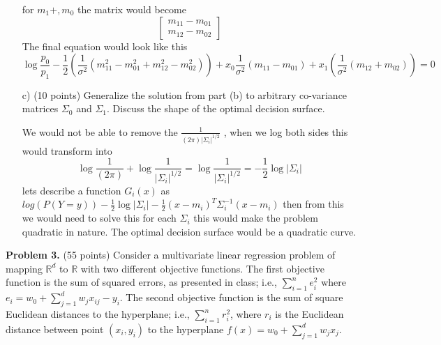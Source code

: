 \documentclass[a4 paper]{article}
\begin{document}
\begin{enumerate}
	for $m_1+,m_0$ the matrix would become
	\begin{equation*}
	\begin{bmatrix}
	m_{11} - m_{01} \\ m_{12} - m_{02}
	\end{bmatrix}
	\end{equation*}
	The final equation would look like this
	\begin{equation*}
	\log{\frac{p_0}{p_1}}-\frac{1}{2}(\frac{1}{\sigma^2}(m_{11}^2-m_{01}^2 + m_{12}^2 - m_{02}^2)) +  x_0\frac{1}{\sigma^2}(m_{11} - m_{01}) + x_1(\frac{1}{\sigma^2}(m_{12} + m _{02})) = 0
	\end{equation*}
	
	\item[c)] (10 points) Generalize the solution from part (b) to arbitrary co-variance matrices $\Sigma_0$ and $\Sigma_1$. Discuss the shape of the optimal decision surface.
	
	We would not be able to remove the  $\frac{1}{(2\pi)|\Sigma_i|^{1/2}}$ , when we log both sides this would transform into 
	\begin{equation*}
	\log{\frac{1}{(2\pi)}} + \log\frac{1}{|\Sigma_i|^{1/2}} = \log\frac{1}{|\Sigma_i|^{1/2}} = -\frac{1}{2}\log{|\Sigma_i|}
	\end{equation*}
	lets describe a function $G_i(x)$ as $log(P(Y=y)) -\frac{1}{2}\log{|\Sigma_i|} -\frac{1}{2}(x-m_i)^T\Sigma_i^{-1}(x-m_i) $ then from this we would need to solve this for each $\Sigma_i$ this would make the problem quadratic in nature. The optimal decision surface would be a quadratic curve.
	 
	\end{enumerate}
	
	\textbf{Problem 3.} (55 points) Consider a multivariate linear regression problem of mapping $\mathbb{R}^d$ to $\mathbb{R}$ with two different objective functions. The first objective function is the sum of squared errors, as presented in class; i.e., $\sum_{i=1}^n{e^2_i}$ where $e_i = w_0 + \sum_{j=1}^d w_jx_{ij}-y_i$. The second objective function is the sum of square Euclidean distances to the hyperplane; i.e., $\sum_{i=1}^nr_i^2$, where $r_i$ is the Euclidean distance between point $(x_i, y_i)$ to the hyperplane $f(x) = w_0 + \sum_{j=1}^dw_jx_j$.
	
\end{document}
